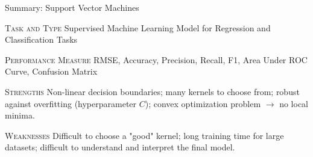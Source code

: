 \documentclass[document.tex]{subfiles}
\begin{document}
    \begin{frame}{Summary: Support Vector Machines}
        \begin{alertblock}{\textsc{Task and Type}}
            Supervised Machine Learning Model for Regression and Classification Tasks
        \end{alertblock}
        \begin{alertblock}{\textsc{Performance Measure}}
            RMSE, Accuracy, Precision, Recall, F1, Area Under ROC Curve, Confusion Matrix
        \end{alertblock}
        \begin{alertblock}{\textsc{Strengths}}
            Non-linear decision boundaries; many kernels to choose from; robust against overfitting (hyperparameter $C$); convex optimization problem $\rightarrow$ no local minima.
        \end{alertblock}
        \begin{alertblock}{\textsc{Weaknesses}}
            Difficult to choose a "good" kernel; long training time for large datasets; difficult to understand and interpret the final model.
        \end{alertblock}
    \end{frame}
\end{document}
